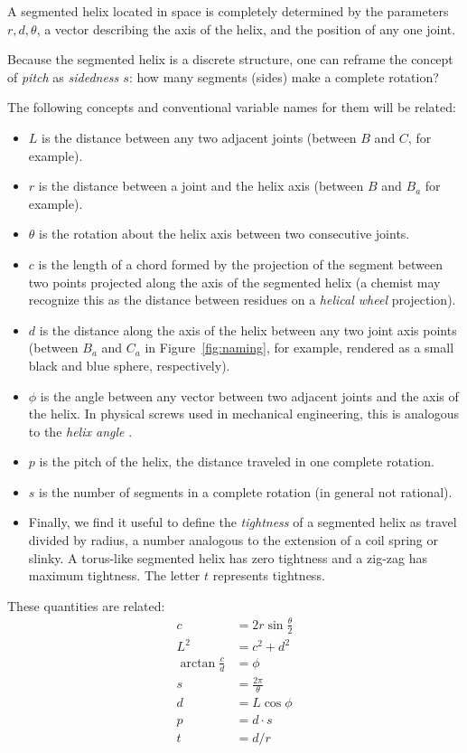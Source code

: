 \documentclass[mathematics,article,submit,pdftex,moreauthors]{Definitions/mdpi}
\begin{document}
A segmented helix located in space is completely determined by
the parameters $r,d,\theta$,
a vector describing the axis
of the helix, and the position of any one joint.

Because the segmented helix is a discrete structure, one can reframe the concept of {\em pitch} as {\em sidedness $s$}:
how many segments (sides)
make a complete rotation?

The following concepts and conventional variable names for them will be related:
\begin{itemize}
\item $L$ is the distance between any two adjacent joints (between $B$ and $C$, for example).
  \item $r$ is the distance between a joint and the helix axis (between $B$ and $B_a$ for example).
  \item $\theta$ is the rotation about the helix axis between two consecutive joints.
  \item $c$ is the length of a chord formed by the projection of the segment between two points projected along the axis of the segmented helix (a chemist may recognize this as the distance between residues on a {\em helical wheel} projection).
  \item $d$ is the distance along the axis of the helix between any two joint axis points (between $B_a$ and $C_a$ in Figure~\ref{fig:naming}, for example, rendered as a small black and blue
    sphere, respectively).
\item $\phi$ is the angle between any vector between two adjacent joints and the axis of the helix. In physical screws used in mechanical engineering, this is analogous to the {\em helix angle} \cite{wiki:helixangle}.
  \item $p$ is the pitch of the helix, the distance traveled in one complete rotation.
  \item $s$ is the number of segments in a complete rotation (in general not rational).
\item  Finally, we find it useful to define the {\em tightness} of a segmented helix
as travel divided by radius, a number
analogous to the extension of a coil spring or slinky.
A torus-like segmented helix has zero tightness and a zig-zag has
maximum tightness. The letter $t$ represents tightness.

  \end{itemize}
These quantities are related:
\begin{align}
    c &= 2r\sin{\frac{\theta}{2}} \\
    L^2 &= c^2+d^2  \\
    \arctan{\frac{c}{d}}  &= \phi \\
    s &= \frac{2 \pi}{\theta} \\
    d &= L \cos{\phi} \\
    p &= d \cdot s \\
    t &= d / r
\end{align}
\end{document}
